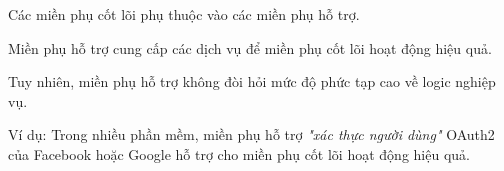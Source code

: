 
Các miền phụ cốt lõi phụ thuộc vào các miền phụ hỗ trợ.

Miền phụ hỗ trợ cung cấp các dịch vụ để miền phụ cốt lõi hoạt động hiệu quả.

Tuy nhiên, miền phụ hỗ trợ không đòi hỏi mức độ phức tạp cao về logic nghiệp vụ.

Ví dụ: Trong nhiều phần mềm, miền phụ hỗ trợ \textit{"xác thực người dùng"} OAuth2 của Facebook hoặc Google hỗ trợ cho miền phụ cốt lõi hoạt động hiệu quả.